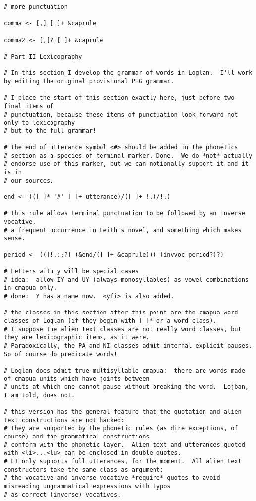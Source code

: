 \documentclass[12pt]{book}
\begin{document}
{\begin{verbatim}
# more punctuation

comma <- [,] [ ]+ &caprule

comma2 <- [,]? [ ]+ &caprule

# Part II Lexicography

# In this section I develop the grammar of words in Loglan.  I'll work by editing the original provisional PEG grammar.

# I place the start of this section exactly here, just before two final items of
# punctuation, because these items of punctuation look forward not only to lexicography
# but to the full grammar!

# the end of utterance symbol <#> should be added in the phonetics
# section as a species of terminal marker. Done.  We do *not* actually
# endorse use of this marker, but we can notionally support it and it is in 
# our sources.

end <- (([ ]* '#' [ ]+ utterance)/([ ]+ !.)/!.)

# this rule allows terminal punctuation to be followed by an inverse vocative,
# a frequent occurrence in Leith's novel, and something which makes sense.

period <- (([!.:;?] (&end/([ ]+ &caprule))) (invvoc period?)?)

# Letters with y will be special cases
# idea:  allow IY and UY (always monosyllables) as vowel combinations in cmapua only.
# done:  Y has a name now.  <yfi> is also added.

# the classes in this section after this point are the cmapua word classes of Loglan (if they begin with [ ]* or a word class).
# I suppose the alien text classes are not really word classes, but they are lexicographic items, as it were.
# Paradoxically, the PA and NI classes admit internal explicit pauses.  So of course do predicate words!

# Loglan does admit true multisyllable cmapua:  there are words made of cmapua units which have joints between
# units at which one cannot pause without breaking the word.  Lojban, I am told, does not.

# this version has the general feature that the quotation and alien text constructions are not hacked:
# they are supported by the phonetic rules (as dire exceptions, of course) and the grammatical constructions
# conform with the phonetic layer.  Alien text and utterances quoted with <li>...<lu> can be enclosed in double quotes.
# LI only supports full utterances, for the moment.  All alien text constructors take the same class as argument:
# the vocative and inverse vocative *require* quotes to avoid misreading ungrammatical expressions with typos
# as correct (inverse) vocatives.


\end{verbatim}}
\end{document}
